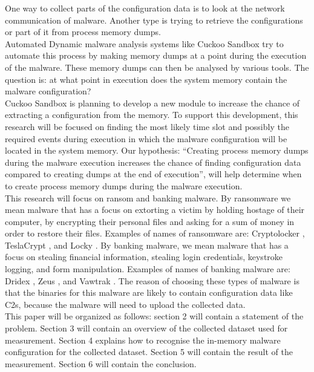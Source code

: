 \documentclass[conference]{IEEEtran}
\begin{document}
One way to collect parts of the configuration data is to look at the network communication of malware. Another type is trying to retrieve the configurations or part of it from process memory dumps.\\

Automated Dynamic malware analysis systems like Cuckoo Sandbox try to automate this process by making memory dumps at a point during the execution of the malware. These memory dumps can then be analysed by various tools. The question is: at what point in execution does the system memory contain the malware configuration?\\

Cuckoo Sandbox is planning to develop a new module to increase the chance of extracting a configuration from the memory. To support this development, this research will be focused on finding the most likely time slot and  possibly  the required events during execution in which the malware configuration will be located in the system memory. 
Our hypothesis: “Creating process memory dumps during the malware execution increases the chance of finding configuration data compared to creating dumps at the end of execution”, will help determine when to create process memory dumps during the malware execution.\\

This research will focus on ransom and banking malware. By ransomware we mean malware that has a focus on extorting a victim by holding hostage of their computer, by encrypting their personal files and asking for a sum of money in order to restore their files. Examples of names of ransomware are: Cryptolocker \cite{tran-cryptolocker}, TeslaCrypt \cite{wyke-currans}, and Locky \cite{long-locky}.
By banking malware, we mean malware that has a focus on stealing financial information, stealing login credentials, keystroke logging, and form manipulation. Examples of names of banking malware are: Dridex \cite{brien-dridex}, Zeus \cite{wyke-zeus}, and Vawtrak \cite{kroustek-vawtrak}. The reason of choosing these types of malware is that the binaries  for this malware are likely to contain configuration data like C2s, because the malware will need to upload the collected data.\\

This paper will be organized as follows:  section 2 will contain a statement of the problem. Section 3 will contain an overview of the collected dataset  used for measurement. Section 4 explains how to recognise the in-memory malware configuration for the collected dataset. Section 5 will contain the result of the measurement. Section 6 will contain the conclusion.\\
\end{document}
